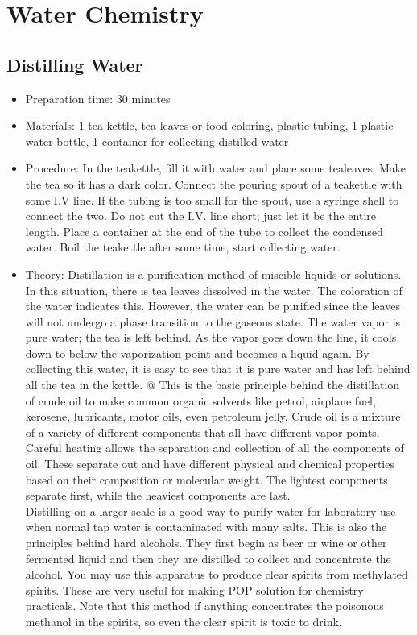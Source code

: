 \section{Water Chemistry}

\subsection{Distilling Water}
\label{sub:distillwater}
\begin{itemize}
\item{Preparation time: 30 minutes}
\item{Materials: 1 tea kettle, tea leaves or food coloring, plastic tubing, 1 plastic water bottle, 1 container for collecting distilled water}
\item{Procedure: In the teakettle, fill it with water and place some tealeaves. Make the tea so it has a dark color. Connect the pouring spout of a teakettle with some I.V line. If the tubing is too small for the spout, use a syringe shell to connect the two. Do not cut the I.V. line short; just let it be the entire length. Place a container at the end of the tube to collect the condensed water. Boil the teakettle after some time, start collecting water. }
\item{Theory: Distillation is a purification method of miscible liquids or solutions. In this situation, there is tea leaves dissolved in the water. The coloration of the water indicates this. However, the water can be purified since the leaves will not undergo a phase transition to the gaseous state. The water vapor is pure water; the tea is left behind. As the vapor goes down the line, it cools down to below the vaporization point and becomes a liquid again. By collecting this water, it is easy to see that it is pure water and has left behind all the tea in the kettle. @	This is the basic principle behind the distillation of crude oil to make common organic solvents like petrol, airplane fuel, kerosene, lubricants, motor oils, even petroleum jelly. Crude oil is a mixture of a variety of different components that all have different vapor points. Careful heating allows the separation and collection of all the components of oil. These separate out and have different physical and chemical properties based on their composition or molecular weight. The lightest components separate first, while the heaviest components are last.\\
Distilling on a larger scale is a good way to purify water for laboratory use when normal tap water is contaminated with many salts. This is also the principles behind hard alcohols. They first begin as beer or wine or other fermented liquid and then they are distilled to collect and concentrate the alcohol. You may use this apparatus to produce clear spirits from methylated spirits. These are very useful for making POP solution for chemistry practicals. Note that this method if anything concentrates the poisonous methanol in the spirits, so even the clear spirit is toxic to drink.}
\end{itemize}

